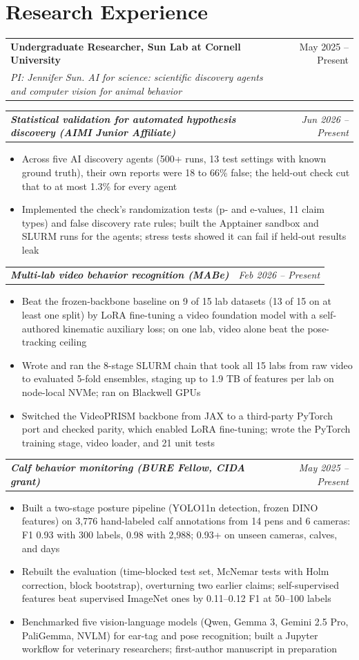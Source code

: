 \documentclass[10pt,letterpaper]{article}
\makeatletter
\newcommand{\entry}[4]{%
  \noindent\begin{tabular*}{\textwidth}{@{}l@{\extracolsep{\fill}}r@{}}
    \textbf{#1} & #2 \\
    \textit{#3} & \textit{#4} \\
  \end{tabular*}\vspace{-1pt}}
\newcommand{\subentry}[2]{%
  \noindent\begin{tabular*}{\textwidth}{@{}l@{\extracolsep{\fill}}r@{}}
    \textbf{\textit{#1}} & \textit{#2} \\
  \end{tabular*}\vspace{-1pt}}
\makeatother
\begin{document}
\section{Research Experience}
\entry{Undergraduate Researcher, Sun Lab at Cornell University}{May 2025 -- Present}{PI: Jennifer Sun. AI for science: scientific discovery agents and computer vision for animal behavior}{}
\subentry{Statistical validation for automated hypothesis discovery (AIMI Junior Af{}f{}iliate)}{Jun 2026 -- Present}
\begin{itemize}
  \item Across five AI discovery agents (500+ runs, 13 test settings with known ground truth), their own reports were 18 to 66\% false; the held-out check cut that to at most 1.3\% for every agent
  \item Implemented the check's randomization tests (p- and e-values, 11 claim types) and false discovery rate rules; built the Apptainer sandbox and SLURM runs for the agents; stress tests showed it can fail if held-out results leak
\end{itemize}
\subentry{Multi-lab video behavior recognition (MABe)}{Feb 2026 -- Present}
\begin{itemize}
  \item Beat the frozen-backbone baseline on 9 of 15 lab datasets (13 of 15 on at least one split) by LoRA fine-tuning a video foundation model with a self-authored kinematic auxiliary loss; on one lab, video alone beat the pose-tracking ceiling
  \item Wrote and ran the 8-stage SLURM chain that took all 15 labs from raw video to evaluated 5-fold ensembles, staging up to 1.9 TB of features per lab on node-local NVMe; ran on Blackwell GPUs
  \item Switched the VideoPRISM backbone from JAX to a third-party PyTorch port and checked parity, which enabled LoRA fine-tuning; wrote the PyTorch training stage, video loader, and 21 unit tests
\end{itemize}
\subentry{Calf behavior monitoring (BURE Fellow, CIDA grant)}{May 2025 -- Present}
\begin{itemize}
  \item Built a two-stage posture pipeline (YOLO11n detection, frozen DINO features) on 3,776 hand-labeled calf annotations from 14 pens and 6 cameras: F1 0.93 with 300 labels, 0.98 with 2,988; 0.93+ on unseen cameras, calves, and days
  \item Rebuilt the evaluation (time-blocked test set, McNemar tests with Holm correction, block bootstrap), overturning two earlier claims; self-supervised features beat supervised ImageNet ones by 0.11--0.12 F1 at 50--100 labels
  \item Benchmarked five vision-language models (Qwen, Gemma 3, Gemini 2.5 Pro, PaliGemma, NVLM) for ear-tag and pose recognition; built a Jupyter workflow for veterinary researchers; first-author manuscript in preparation
\end{itemize}
\end{document}

